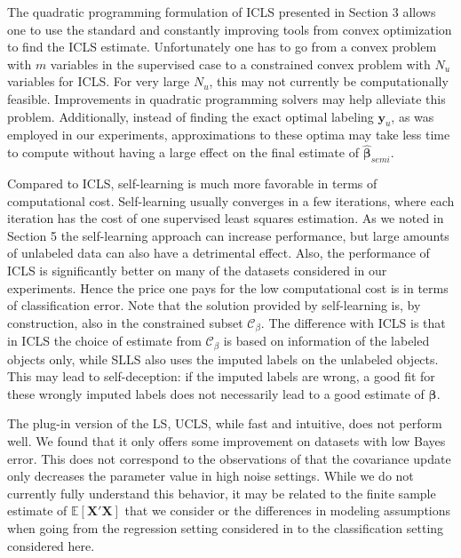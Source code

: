 \documentclass{elsarticle}
\newcommand{\Cb}{\mathcal{C}_{\beta}}
\begin{document}
The quadratic programming formulation of ICLS presented in Section 3 allows one to use the standard and constantly improving tools from convex optimization to find the ICLS estimate. Unfortunately one has to go from a convex problem with $m$ variables in the supervised case to a constrained convex problem with $N_u$ variables for ICLS. For very large $N_u$, this may not currently be computationally feasible. Improvements in quadratic programming solvers may help alleviate this problem. Additionally, instead of finding the exact optimal labeling $\mathbf{y}_u$, as was employed in our experiments, approximations to these optima may take less time to compute without having a large effect on the final estimate of $\boldsymbol{\hat{\beta}}_{semi}$.

Compared to ICLS, self-learning is much more favorable in terms of computational cost. Self-learning usually converges in a few iterations, where each iteration has the cost of one supervised least squares estimation. As we noted in Section 5 the self-learning approach can increase performance, but large amounts of unlabeled data can also have a detrimental effect. Also, the performance of ICLS is significantly better on many of the datasets considered in our experiments. Hence the price one pays for the low computational cost is in terms of classification error. Note that the solution provided by self-learning is, by construction, also in the constrained subset $\Cb$. The difference with ICLS is that in ICLS the choice of estimate from $\Cb$ is based on information of the labeled objects only, while SLLS also uses the imputed labels on the unlabeled objects. This may lead to self-deception: if the imputed labels are wrong, a good fit for these wrongly imputed labels does not necessarily lead to a good estimate of $\boldsymbol{\beta}$.

The plug-in version of the LS, UCLS, while fast and intuitive, does not perform well. We found that it only offers some improvement on datasets with low Bayes error. This does not correspond to the observations of \cite{Shaffer1991} that the covariance update only decreases the parameter value in high noise settings. While we do not currently fully understand this behavior, it may be related to the finite sample estimate of $\mathbb{E}[\mathbf{X}'\mathbf{X}]$ that we consider or the differences in modeling assumptions when going from the regression setting considered in \cite{Shaffer1991} to the classification setting considered here.
\end{document}
